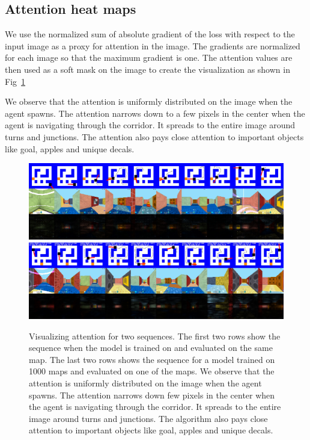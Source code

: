 \subsection{Attention heat maps}
We use the normalized sum of absolute gradient of the loss with respect to the input image as a proxy for attention in the image.
The gradients are normalized for each image so that the maximum gradient is one. The attention values are then used as a soft mask on the image to create the visualization as shown in Fig~\ref{fig:attention}

We observe that the attention is uniformly distributed on the image when the agent spawns. The attention narrows down to a few pixels in the center when the agent is navigating through the corridor. It spreads to the entire image around turns and junctions. The attention also pays close attention to important objects like goal, apples and unique decals.

\begin{figure}
\includegraphics[width=\textwidth,trim=0 0 0 336pt,clip]{./exp-results/training-09x09-0127-on-0127.png}\vspace{1ex}\\
%
\includegraphics[width=\textwidth,trim=0 0 0 336pt,clip]{./exp-results/training-1000-on-0127.png}%
\caption{Visualizing attention for two sequences. The first two rows show the sequence when the model is trained on and evaluated on the same map. The last two rows shows the sequence for a model trained on 1000 maps and evaluated on one of the maps. We observe that the attention is uniformly distributed on the image when the agent spawns. The attention narrows down few pixels in the center when the agent is navigating through the corridor. It spreads to the entire image around turns and junctions. The algorithm also pays close attention to important objects like goal, apples and unique decals.}
\label{fig:attention}
\end{figure}


%



